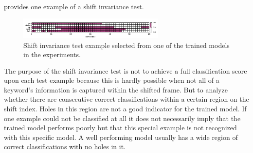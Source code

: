  provides one example of a shift invariance test.
\begin{figure}[!ht]
  \centering
    \includegraphics[width=0.65\textwidth]{./5_exp/figs/exp_fs_cepstral_tb_shift_conv-jim_mfcc12_norm0.png}
  \caption{Shift invariance test example selected from one of the trained models in the experiments.}
  \label{fig:exp_details_tb_shift}
\end{figure}
\FloatBarrier
\noindent
The purpose of the shift invariance test is not to achieve a full classification score upon each test example because this is hardly possible when not all of a keyword's information is captured within the shifted frame.
But to analyze whether there are consecutive correct classifications within a certain region on the shift index.
Holes in this region are not a good indicator for the trained model.
If one example could not be classified at all it does not necessarily imply that the trained model performs poorly but that this special example is not recognized with this specific model.
A well performing model usually has a wide region of correct classifications with no holes in it.



